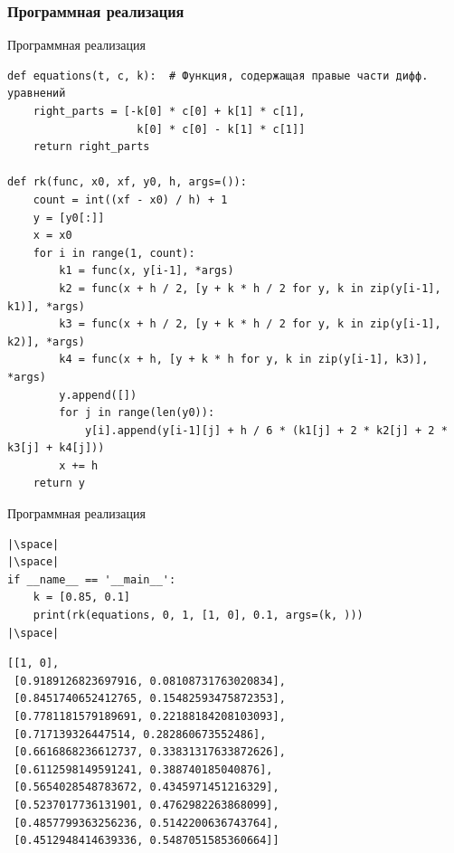 \documentclass[aspectratio=169, mathserif]{beamer}	%
\begin{document}
\subsubsection{Программная реализация}
\begin{frame}[fragile, label=c]{Программная реализация}
\scriptsize
\begin{verbatim}
def equations(t, c, k):  # Функция, содержащая правые части дифф. уравнений
    right_parts = [-k[0] * c[0] + k[1] * c[1],
                    k[0] * c[0] - k[1] * c[1]]
    return right_parts

def rk(func, x0, xf, y0, h, args=()):
    count = int((xf - x0) / h) + 1
    y = [y0[:]]
    x = x0
    for i in range(1, count):
        k1 = func(x, y[i-1], *args)
        k2 = func(x + h / 2, [y + k * h / 2 for y, k in zip(y[i-1], k1)], *args)
        k3 = func(x + h / 2, [y + k * h / 2 for y, k in zip(y[i-1], k2)], *args)
        k4 = func(x + h, [y + k * h for y, k in zip(y[i-1], k3)], *args)
        y.append([])
        for j in range(len(y0)):
            y[i].append(y[i-1][j] + h / 6 * (k1[j] + 2 * k2[j] + 2 * k3[j] + k4[j]))
        x += h
    return y
\end{verbatim}
\vfill
\end{frame}


\begin{frame}[fragile, label=c]{Программная реализация}
\scriptsize
\begin{verbatim}
|\space|
|\space|
if __name__ == '__main__':
    k = [0.85, 0.1]
    print(rk(equations, 0, 1, [1, 0], 0.1, args=(k, )))
|\space|
\end{verbatim}
\vfill
\begin{verbatim}
[[1, 0],
 [0.9189126823697916, 0.08108731763020834],
 [0.8451740652412765, 0.15482593475872353],
 [0.7781181579189691, 0.22188184208103093],
 [0.717139326447514, 0.282860673552486],
 [0.6616868236612737, 0.33831317633872626],
 [0.6112598149591241, 0.388740185040876],
 [0.5654028548783672, 0.4345971451216329],
 [0.5237017736131901, 0.4762982263868099],
 [0.4857799363256236, 0.5142200636743764],
 [0.4512948414639336, 0.5487051585360664]]
\end{verbatim}
\vfill
\end{frame}
\end{document}

